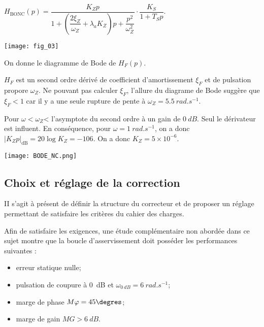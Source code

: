 \ifprof
\begin{corrige}
$H_{\text{BONC}}(p) = \dfrac{K_Z p}{ 1+\left(\dfrac{2\xi_Z}{\omega_Z}+\lambda_a K_Z\right)p+\dfrac{p^2}{\omega_Z^2} } \cdot \dfrac{K_S}{1+T_Sp} $.
\end{corrige}
\else
\fi


\ifprof
\else

\begin{marginfigure}
\texttt{[image: fig\_03]}
\end{marginfigure}
\fi

On donne le diagramme de Bode de $H_F(p)$.

\ifprof
\begin{corrige}
$H_F$ est un second ordre dérivé de coefficient d'amortissement $\xi_{F}$ et de pulsation propore $\omega_{Z}$. Ne pouvant pas calculer $\xi_{F}$, l'allure du diagrame de Bode suggère que $\xi_{F}<1$ car il y a une seule rupture de pente à $\omega_Z= \SI{5,5}{rad.s^{-1}}$.

Pour $\omega<\omega_Z$< l'asymptote du second ordre à un gain de $\SI{0}{dB}$. Seul le dérivateur est influent. En conséquence, pour $\omega =\SI{1}{rad.s^{-1}}$, on a donc $\left| K_Z p\right|_{\text{dB}}=20\log K_Z=-106$. On a donc $K_Z=5\times 10^{-6}$. 

\begin{center}
\texttt{[image: BODE\_NC.png]}
\end{center}
\end{corrige}
\else
\fi

\subsection*{Choix et réglage de la correction}
\begin{obj}
II s'agit à présent de définir la structure du correcteur et de proposer un réglage permettant de satisfaire les critères du cahier des charges.
\end{obj}
\ifprof
\else
Afin de satisfaire les exigences, une étude complémentaire non abordée dans ce sujet montre que la boucle d'asservissement doit posséder les performances suivantes :
\begin{itemize}
\item erreur statique nulle;
\item pulsation de coupure à \SI{0}{dB} et $\omega_{\SI{0}{dB}}= \SI{6}{rad.s^{-1}}$;
\item marge de phase $M\varphi = 45\degres$;
\item marge de gain $MG > \SI{6}{dB}$.
\end{itemize}
\fi

